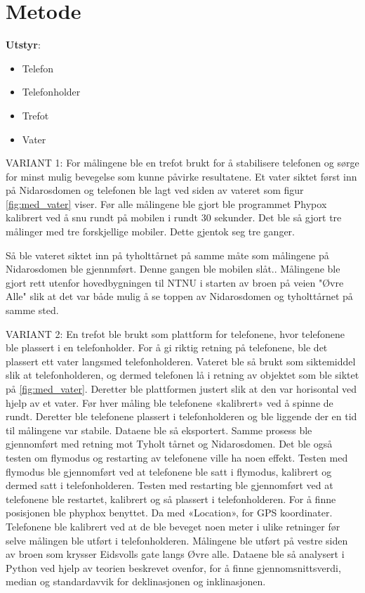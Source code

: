 \section{Metode}
\noindent\textbf{Utstyr}:
\begin{itemize}
    \item Telefon
    \item Telefonholder
    \item Trefot
    \item Vater
\end{itemize}
VARIANT 1:
For målingene ble en trefot brukt for å stabilisere telefonen og sørge for minst mulig bevegelse som kunne påvirke resultatene. Et vater siktet først inn på Nidarosdomen og telefonen ble lagt ved siden av vateret som figur \ref{fig:med_vater} viser. Før alle målingene ble gjort ble programmet Phypox kalibrert ved å snu rundt på mobilen i rundt 30 sekunder. Det ble så gjort tre målinger med tre forskjellige mobiler. Dette gjentok seg tre ganger.

Så ble vateret siktet inn på tyholttårnet på samme måte som målingene på Nidarosdomen ble gjennmført. Denne gangen ble mobilen slåt..
Målingene ble gjort rett utenfor hovedbygningen til NTNU i starten av broen på veien "Øvre Alle" slik at det var både mulig å se toppen av Nidarosdomen og tyholttårnet på samme sted.  \newline


VARIANT 2:
En trefot ble brukt som plattform for telefonene, hvor telefonene ble plassert i en telefonholder. For å gi riktig retning på telefonene, ble det plassert ett vater langsmed telefonholderen. Vateret ble så brukt som siktemiddel slik at telefonholderen, og dermed telefonen lå i retning av objektet som ble siktet på \ref{fig:med_vater}. Deretter ble plattformen justert slik at den var horisontal ved hjelp av et vater. 
Før hver måling ble telefonene «kalibrert» ved å spinne de rundt. Deretter ble telefonene plassert i telefonholderen og ble liggende der en tid til målingene var stabile. Dataene ble så eksportert. Samme prosess ble gjennomført med retning mot Tyholt tårnet og Nidarosdomen. 
Det ble også testen om flymodus og restarting av telefonene ville ha noen effekt. Testen med flymodus ble gjennomført ved at telefonene ble satt i flymodus, kalibrert og dermed satt i telefonholderen. Testen med restarting ble gjennomført ved at telefonene ble restartet, kalibrert og så plassert i telefonholderen.
For å finne posisjonen ble phyphox benyttet. Da med «Location», for GPS koordinater. Telefonene ble kalibrert ved at de ble beveget noen meter i ulike retninger før selve målingen ble utført i telefonholderen. Målingene ble utført på vestre siden av broen som krysser Eidsvolls gate langs Øvre alle. 
Dataene ble så analysert i Python ved hjelp av teorien beskrevet ovenfor, for å finne gjennomsnittsverdi, median og standardavvik for deklinasjonen og inklinasjonen.   

